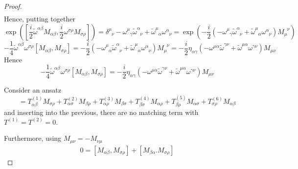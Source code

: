 \begin{proof}
\begin{equation*}
\begin{aligned}
        \end{aligned}
        \end{equation*}
        Hence, putting together
        \begin{equation*}
            \exp([\frac{i}{2} \tilde \omega^{\alpha \beta} M_{\alpha \beta}, \frac{i}{2} \omega^{\sigma \rho} M_{\sigma \rho}]) = \delta^{\mu}_{\phantom \mu \nu} - \omega^{\mu}_{\phantom \mu \gamma} \tilde \omega^{\alpha}_{\phantom \alpha \nu} + \tilde \omega^{\mu}_{\phantom \mu \alpha} \omega^{\alpha}_{\phantom \alpha \nu} = \exp(-\frac{i}{2} (-\omega^{\mu}_{\phantom \mu \gamma} \tilde \omega^{\alpha}_{\phantom \alpha \nu} + \tilde \omega^{\mu}_{\phantom \mu \alpha} \omega^{\alpha}_{\phantom \alpha \nu}) M_\mu^{\phantom \mu\nu})
        \end{equation*}
        \begin{equation*}
            - \frac{1}{4} \tilde \omega^{\alpha \beta} \omega^{\sigma \rho}[M_{\alpha \beta}, M_{\sigma \rho}] = -\frac{i}{2} (-\omega^{\mu}_{\phantom \mu \alpha} \tilde \omega^{\alpha}_{\phantom \alpha \nu} + \tilde \omega^{\mu}_{\phantom \mu \alpha} \omega^{\alpha}_{\phantom \alpha \nu}) M_\mu^{\phantom \mu\nu} = - \frac{i}{2} \eta_{\alpha \gamma} (-\omega^{\mu\alpha} \tilde \omega^{\gamma\nu} + \tilde \omega^{\mu\alpha} \omega^{\gamma \nu}) M_{\mu\nu}
        \end{equation*}
        Hence 
        \begin{equation*}
            - \frac{1}{4} \tilde \omega^{\alpha \beta} \omega^{\sigma \rho}[M_{\alpha \beta}, M_{\sigma \rho}] = - \frac{i}{2} \eta_{\alpha \gamma} (-\omega^{\mu\alpha} \tilde \omega^{\gamma\nu} + \tilde \omega^{\mu\alpha} \omega^{\gamma \nu}) M_{\mu\nu}
        \end{equation*}
    
        Consider an ansatz 
        \begin{equation*}
            [M_{\alpha\beta}, M_{\sigma\rho}] = T^{(1)}_{\alpha\beta} M_{\sigma\rho} + T^{(2)}_{\alpha\sigma} M_{\beta\rho} + T^{(3)}_{\alpha\rho} M_{\beta\sigma} + T^{(4)}_{\beta\sigma} M_{\alpha\rho} + T^{(5)}_{\beta\rho} M_{\alpha\sigma } + T^{(6)}_{\sigma\rho} M_{\alpha\beta}
        \end{equation*}
        and inserting into the previous, there are no matching term with $T^{(1)} = T^{(2)} = 0$. 
    
        Furthermore, using $M_{\mu\nu} = - M_{\nu\mu}$
        \begin{equation*}
        \begin{aligned}
            0 = [M_{\alpha\beta}, M_{\sigma \rho}] + [M_{\beta\alpha}. M_{\sigma\rho}]
        \end{aligned}
        \end{equation*}
    \end{proof}

